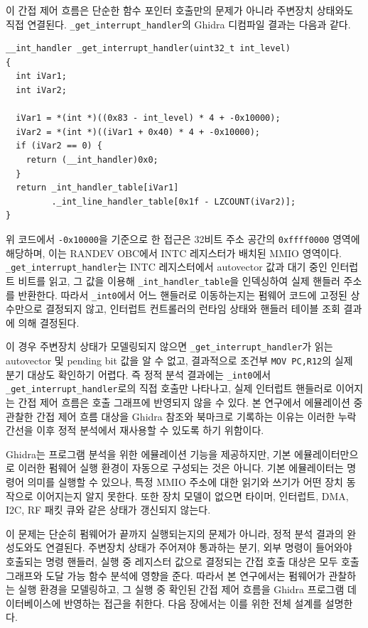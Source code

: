 \documentclass[master,korean,final]{kaist-ucs}
\begin{document}
이 간접 제어 흐름은 단순한 함수 포인터 호출만의 문제가 아니라 주변장치 상태와도 직접 연결된다. \texttt{\_get\_interrupt\_handler}의 Ghidra 디컴파일 결과는 다음과 같다.

\begin{verbatim}
__int_handler _get_interrupt_handler(uint32_t int_level)
{
  int iVar1;
  int iVar2;

  iVar1 = *(int *)((0x83 - int_level) * 4 + -0x10000);
  iVar2 = *(int *)((iVar1 + 0x40) * 4 + -0x10000);
  if (iVar2 == 0) {
    return (__int_handler)0x0;
  }
  return _int_handler_table[iVar1]
         ._int_line_handler_table[0x1f - LZCOUNT(iVar2)];
}
\end{verbatim}

위 코드에서 \texttt{-0x10000}을 기준으로 한 접근은 32비트 주소 공간의 \texttt{0xffff0000} 영역에 해당하며, 이는 RANDEV OBC에서 INTC 레지스터가 배치된 MMIO 영역이다. \texttt{\_get\_interrupt\_handler}는 INTC 레지스터에서 autovector 값과 대기 중인 인터럽트 비트를 읽고, 그 값을 이용해 \texttt{\_int\_handler\_table}을 인덱싱하여 실제 핸들러 주소를 반환한다. 따라서 \texttt{\_int0}에서 어느 핸들러로 이동하는지는 펌웨어 코드에 고정된 상수만으로 결정되지 않고, 인터럽트 컨트롤러의 런타임 상태와 핸들러 테이블 조회 결과에 의해 결정된다.

이 경우 주변장치 상태가 모델링되지 않으면 \texttt{\_get\_interrupt\_handler}가 읽는 autovector 및 pending bit 값을 알 수 없고, 결과적으로 조건부 \texttt{MOV PC,R12}의 실제 분기 대상도 확인하기 어렵다. 즉 정적 분석 결과에는 \texttt{\_int0}에서 \texttt{\_get\_interrupt\_handler}로의 직접 호출만 나타나고, 실제 인터럽트 핸들러로 이어지는 간접 제어 흐름은 호출 그래프에 반영되지 않을 수 있다. 본 연구에서 에뮬레이션 중 관찰한 간접 제어 흐름 대상을 Ghidra 참조와 북마크로 기록하는 이유는 이러한 누락 간선을 이후 정적 분석에서 재사용할 수 있도록 하기 위함이다.

Ghidra는 프로그램 분석을 위한 에뮬레이션 기능을 제공하지만, 기본 에뮬레이터만으로 이러한 펌웨어 실행 환경이 자동으로 구성되는 것은 아니다. 기본 에뮬레이터는 명령어 의미를 실행할 수 있으나, 특정 MMIO 주소에 대한 읽기와 쓰기가 어떤 장치 동작으로 이어지는지 알지 못한다. 또한 장치 모델이 없으면 타이머, 인터럽트, DMA, I2C, RF 패킷 큐와 같은 상태가 갱신되지 않는다.

이 문제는 단순히 펌웨어가 끝까지 실행되는지의 문제가 아니라, 정적 분석 결과의 완성도와도 연결된다. 주변장치 상태가 주어져야 통과하는 분기, 외부 명령이 들어와야 호출되는 명령 핸들러, 실행 중 레지스터 값으로 결정되는 간접 호출 대상은 모두 호출 그래프와 도달 가능 함수 분석에 영향을 준다. 따라서 본 연구에서는 펌웨어가 관찰하는 실행 환경을 모델링하고, 그 실행 중 확인된 간접 제어 흐름을 Ghidra 프로그램 데이터베이스에 반영하는 접근을 취한다. 다음 장에서는 이를 위한 전체 설계를 설명한다.
\end{document}

